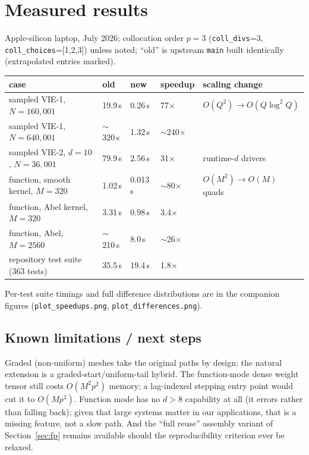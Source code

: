 \documentclass[11pt]{article}
\begin{document}
\section{Measured results}
\label{sec:results}

Apple-silicon laptop, July 2026; collocation order $p=3$
(\texttt{coll\_divs}=3, \texttt{coll\_choices}=[1,2,3]) unless noted;
``old'' is upstream \texttt{main} built identically (extrapolated
entries marked).

\begin{center}
\begin{tabular}{lllll}
\toprule
case & old & new & speedup & scaling change\\
\midrule
sampled VIE-1, $N=160{,}001$ & 19.9\,s & 0.26\,s & 77$\times$ &
  $O(Q^2)\to O(Q\log^2 Q)$\\
sampled VIE-1, $N=640{,}001$ & $\sim$320\,s & 1.32\,s & $\sim$240$\times$ & \\
sampled VIE-2, $d=10$, $N=36{,}001$ & 79.9\,s & 2.56\,s & 31$\times$ &
  runtime-$d$ drivers\\
function, smooth kernel, $M=320$ & 1.02\,s & 0.013\,s & $\sim$80$\times$ &
  $O(M^2)\to O(M)$ quads\\
function, Abel kernel, $M=320$ & 3.31\,s & 0.98\,s & 3.4$\times$ & \\
function, Abel, $M=2560$ & $\sim$210\,s & 8.0\,s & $\sim$26$\times$ & \\
repository test suite (363 tests) & 35.5\,s & 19.4\,s & 1.8$\times$ & \\
\bottomrule
\end{tabular}
\end{center}

Per-test suite timings and full difference distributions are in the
companion figures (\texttt{plot\_speedups.png},
\texttt{plot\_differences.png}).

\subsection*{Known limitations / next steps}
Graded (non-uniform) meshes take the original paths by design; the
natural extension is a graded-start/uniform-tail hybrid. The
function-mode dense weight tensor still costs $O(M^2p^2)$ memory; a
lag-indexed stepping entry point would cut it to $O(Mp^2)$. Function
mode has no $d>8$ capability at all (it errors rather than falling
back); given that large systems matter in our applications, that is a
missing feature, not a slow path. And the ``full reuse'' assembly
variant of Section~\ref{sec:fp} remains available should the
reproducibility criterion ever be relaxed.
\end{document}
